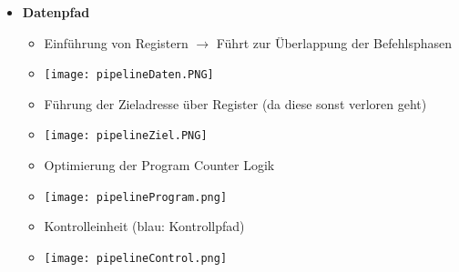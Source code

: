 \begin{itemize}
        \item \textbf{Datenpfad}
            \begin{itemize}
                \item Einführung von Registern $\rightarrow$ Führt zur Überlappung der Befehlsphasen
                \item[] \texttt{[image: pipelineDaten.PNG]}
                \item Führung der Zieladresse über Register (da diese sonst verloren geht)
                \item[] \texttt{[image: pipelineZiel.PNG]}
                \item Optimierung der Program Counter Logik
                \item[] \texttt{[image: pipelineProgram.png]}
                \item Kontrolleinheit (blau: Kontrollpfad)
                \item[] \texttt{[image: pipelineControl.png]}  
            \end{itemize}
    \end{itemize}
